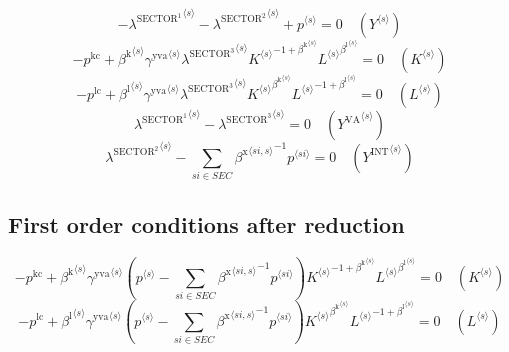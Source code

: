 \begin{equation}
-{\lambda^{\mathrm{SECTOR}^{\mathrm{1}}}}^{\langle s\rangle} - {\lambda^{\mathrm{SECTOR}^{\mathrm{2}}}}^{\langle s\rangle} + {p}^{\langle s\rangle} = 0
 \quad \left({Y}^{\langle s\rangle}\right)
\end{equation}
\begin{equation}
-p^{\mathrm{kc}} + {{\beta^{\mathrm{k}}}^{\langle s\rangle}} {{\gamma^{\mathrm{yva}}}^{\langle s\rangle}} {{\lambda^{\mathrm{SECTOR}^{\mathrm{3}}}}^{\langle s\rangle}} {{{K}^{\langle s\rangle}}^{-1 + {\beta^{\mathrm{k}}}^{\langle s\rangle}}} {{{L}^{\langle s\rangle}}^{{\beta^{\mathrm{l}}}^{\langle s\rangle}}} = 0
 \quad \left({K}^{\langle s\rangle}\right)
\end{equation}
\begin{equation}
-p^{\mathrm{lc}} + {{\beta^{\mathrm{l}}}^{\langle s\rangle}} {{\gamma^{\mathrm{yva}}}^{\langle s\rangle}} {{\lambda^{\mathrm{SECTOR}^{\mathrm{3}}}}^{\langle s\rangle}} {{{K}^{\langle s\rangle}}^{{\beta^{\mathrm{k}}}^{\langle s\rangle}}} {{{L}^{\langle s\rangle}}^{-1 + {\beta^{\mathrm{l}}}^{\langle s\rangle}}} = 0
 \quad \left({L}^{\langle s\rangle}\right)
\end{equation}
\begin{equation}
{\lambda^{\mathrm{SECTOR}^{\mathrm{1}}}}^{\langle s\rangle} - {\lambda^{\mathrm{SECTOR}^{\mathrm{3}}}}^{\langle s\rangle} = 0
 \quad \left({Y^{\mathrm{VA}}}^{\langle s\rangle}\right)
\end{equation}
\begin{equation}
{\lambda^{\mathrm{SECTOR}^{\mathrm{2}}}}^{\langle s\rangle} - \sum_{{s\!i}\in {S\!E\!C}} {{\beta^{\mathrm{x}}}^{\langle {s\!i},s\rangle}}^{-1} {{p}^{\langle {s\!i}\rangle}} = 0
 \quad \left({Y^{\mathrm{INT}}}^{\langle s\rangle}\right)
\end{equation}


\subsection{First order conditions after reduction}

\begin{equation}
-p^{\mathrm{kc}} + {{\beta^{\mathrm{k}}}^{\langle s\rangle}} {{\gamma^{\mathrm{yva}}}^{\langle s\rangle}} \left({p}^{\langle s\rangle} - \sum_{{s\!i}\in {S\!E\!C}} {{\beta^{\mathrm{x}}}^{\langle {s\!i},s\rangle}}^{-1} {{p}^{\langle {s\!i}\rangle}}\right) {{{K}^{\langle s\rangle}}^{-1 + {\beta^{\mathrm{k}}}^{\langle s\rangle}}} {{{L}^{\langle s\rangle}}^{{\beta^{\mathrm{l}}}^{\langle s\rangle}}} = 0
 \quad \left({K}^{\langle s\rangle}\right)
\end{equation}
\begin{equation}
-p^{\mathrm{lc}} + {{\beta^{\mathrm{l}}}^{\langle s\rangle}} {{\gamma^{\mathrm{yva}}}^{\langle s\rangle}} \left({p}^{\langle s\rangle} - \sum_{{s\!i}\in {S\!E\!C}} {{\beta^{\mathrm{x}}}^{\langle {s\!i},s\rangle}}^{-1} {{p}^{\langle {s\!i}\rangle}}\right) {{{K}^{\langle s\rangle}}^{{\beta^{\mathrm{k}}}^{\langle s\rangle}}} {{{L}^{\langle s\rangle}}^{-1 + {\beta^{\mathrm{l}}}^{\langle s\rangle}}} = 0
 \quad \left({L}^{\langle s\rangle}\right)
\end{equation}




